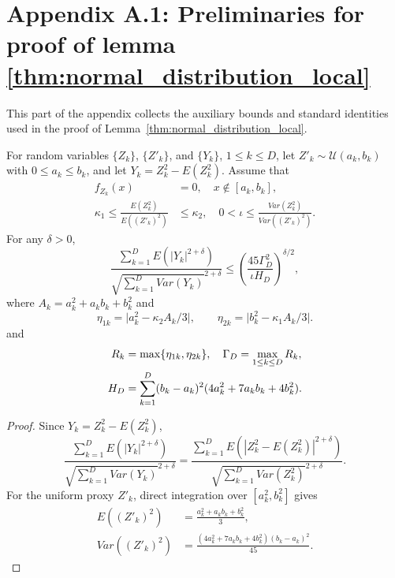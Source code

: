 \section*{Appendix A.1: Preliminaries for proof of lemma \ref{thm:normal_distribution_local}}
This part of the appendix collects the auxiliary bounds and standard identities used in the proof of Lemma~\ref{thm:normal_distribution_local}.
\begin{lemma}\label{lm:Y_K_delta_moment_bound}
For random variables $\{Z_k\}$, $\{Z'_k\}$, and $\{Y_k\}$, $1\leq k\leq D$, let
$Z'_k\sim\mathcal{U}(a_k,b_k)$ with $0\leq a_k\leq b_k$, and let
$Y_k=Z_k^2-E(Z_k^2)$. Assume that
\begin{align}
f_{Z_k}(x)&=0,\quad x\notin[a_k,b_k], \label{equ:pdf_not_in_ab}\\
\kappa_1 \leq
\frac{E(Z_k^2)}{E((Z'_k)^2)}
&\leq \kappa_2,\quad
0<\iota\leq
\frac{Var(Z_k^2)}{Var((Z'_k)^2)} .
\label{equ:expectation_variance_appro}
\end{align}
For any $\delta>0$,
\begin{equation}
\frac{\sum_{k=1}^{D}E(|Y_k|^{2+\delta})}
{\sqrt{\sum_{k=1}^{D}Var(Y_k)}^{2+\delta}}
\leq
\left(\frac{45\Gamma_D^2}{\iota H_D}\right)^{\delta/2},
\label{equ:lemma_1_conclusion}
\end{equation}
where $A_k=a_k^2+a_kb_k+b_k^2$ and
\begin{equation}
\eta_{1k}=\lvert a_k^2-\kappa_2 A_k/3\rvert,\qquad
\eta_{2k}=\lvert b_k^2-\kappa_1 A_k/3\rvert .
\end{equation}
and
\begin{align}
R_k&=\max\{\eta_{1k},\eta_{2k}\},\quad
\Gamma_D=\max_{1\leq k\leq D}R_k, \notag\\
H_D&=\sum_{k=1}^{D}(b_k-a_k)^2(4a_k^2+7a_kb_k+4b_k^2). \notag
\end{align}
\begin{proof}
Since $Y_k=Z_k^2-E(Z_k^2)$,
\begin{equation}
\frac{\sum_{k=1}^{D}E(|Y_k|^{2+\delta})}
{\sqrt{\sum_{k=1}^{D}Var(Y_k)}^{2+\delta}}
=
\frac{\sum_{k=1}^{D}E(|Z_k^2-E(Z_k^2)|^{2+\delta})}
{\sqrt{\sum_{k=1}^{D}Var(Z_k^2)}^{2+\delta}} .
\label{equ:Y_k_TO_Z_k}
\end{equation}
For the uniform proxy $Z'_k$, direct integration over $[a_k^2,b_k^2]$ gives
\begin{align}
E((Z'_k)^2)
&=\frac{a_k^2+a_kb_k+b_k^2}{3},
\label{equ:z_k_E}\\
Var((Z'_k)^2)
&=\frac{(4a_k^2+7a_kb_k+4b_k^2)(b_k-a_k)^2}{45}.
\label{equ:z_k_variance}

\end{align}
\end{proof}
\end{lemma}
